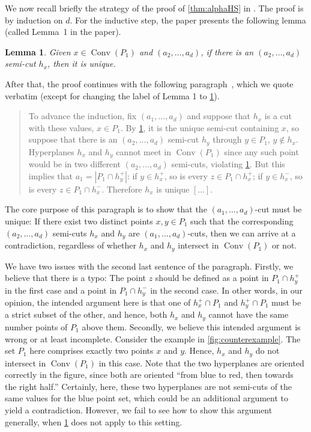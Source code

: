 \documentclass[a4paper,UKenglish,cleveref, autoref, thm-restate, nolineno]{socg-lipics-v2021}
\DeclareMathOperator{\conv}{Conv}
\newtheorem{longlemma}{Lemma}
\begin{document}
We now recall briefly the strategy of the proof of \cref{thm:alphaHS} in \cite{steigerGeneralizedHamSandwichCuts2010}.
The proof is by induction on $d$.
For the inductive step, the paper presents the following lemma (called Lemma~1 in the paper).

\begin{longlemma}
\label{lem:app_lem1}
Given $x \in \conv(P_1)$ and $(a_2, \dots , a_d)$, if there is an $(a_2, \dots , a_d)$ semi-cut
$h_x$, then it is unique.
\end{longlemma}

After that, the proof continues with the following paragraph~\cite[Page 539]{steigerGeneralizedHamSandwichCuts2010}, which we quote verbatim (except for changing the label of Lemma 1 to \cref{lem:app_lem1}).

\begin{quote}
    \small
    To advance the induction, fix $(a_1, . . . , a_d)$ and suppose that $h_x$ is a cut with these
values, $x \in P_1$. 
    By \cref{lem:app_lem1}, it is the unique semi-cut containing $x$, so suppose that there is an $(a_2, \dots , a_d)$ semi-cut $h_y$ through $y \in P_1$, $y \notin h_x$. Hyperplanes $h_x$ and $h_y$ cannot meet in $\conv(P_1)$ since any such point would be in two different $(a_2, \dots ,a_d)$ semi-cuts, violating \cref{lem:app_lem1}. But this implies that $a_1 = |P_1 \cap h^+_y|$: if $y \in h^+_x$, so is every $z \in P_1 \cap h^+_x$; if $y \in h^-_x$, so is every $z \in P_1 \cap h^-_x$. Therefore $h_x$ is unique $[\dots]$.
\end{quote}

The core purpose of this paragraph is to show that the $(a_1, \dots, a_d)$-cut must be unique:
If there exist two distinct points $x, y \in P_1$ such that the corresponding $(a_2, \dots , a_d)$ semi-cuts $h_x$ and $h_y$ are $(a_1, \dots, a_d)$-cuts, then we can arrive at a contradiction, regardless of whether $h_x$ and $h_y$ intersect in $\conv(P_1)$ or not.

We have two issues with the second last sentence of the paragraph.
Firstly, we believe that there is a typo: The point $z$ should be defined as a point in $P_1 \cap h^+_y$ in the first case and a point in $P_1 \cap h^-_y$ in the second case.
In other words, in our opinion, the intended argument here is that one of $h_x^+ \cap P_1$ and $h_y^+ \cap P_1$ must be a strict subset of the other, and hence, both $h_x$ and $h_y$ cannot have the same number points of $P_1$ above them.
Secondly, we believe this intended argument is wrong or at least incomplete.
Consider the example in \cref{fig:counterexample}.
The set $P_1$ here comprises exactly two points $x$ and $y$.
Hence, $h_x$ and $h_y$ do not intersect in $\conv(P_1)$ in this case.
Note that the two hyperplanes are oriented correctly in the figure, since both are oriented ``from blue to red, then towards the right half.''
Certainly, here, these two hyperplanes are not semi-cuts of the same values for the blue point set, which could be an additional argument to yield a contradiction.
However, we fail to see how to show this argument generally, when \cref{lem:app_lem1} does not apply to this setting.
\end{document}

